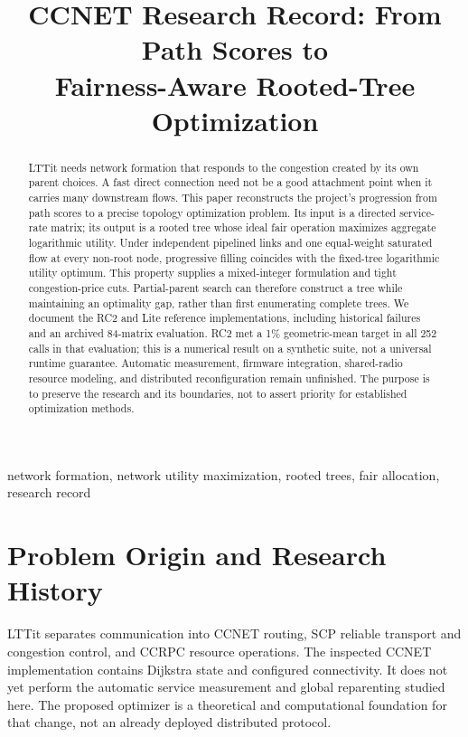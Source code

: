 \documentclass[conference,letterpaper]{IEEEtran}
\title{CCNET Research Record: From Path Scores to\\Fairness-Aware Rooted-Tree Optimization}
\author{\IEEEauthorblockN{Skai Uijing}\IEEEauthorblockA{LTTit Research\\Research record, October 6, 2026}}
\begin{document}
\maketitle
\begin{abstract}
LTTit needs network formation that responds to the congestion created by its own parent choices. A fast direct connection need not be a good attachment point when it carries many downstream flows. This paper reconstructs the project's progression from path scores to a precise topology optimization problem. Its input is a directed service-rate matrix; its output is a rooted tree whose ideal fair operation maximizes aggregate logarithmic utility. Under independent pipelined links and one equal-weight saturated flow at every non-root node, progressive filling coincides with the fixed-tree logarithmic utility optimum. This property supplies a mixed-integer formulation and tight congestion-price cuts. Partial-parent search can therefore construct a tree while maintaining an optimality gap, rather than first enumerating complete trees. We document the RC2 and Lite reference implementations, including historical failures and an archived 84-matrix evaluation. RC2 met a 1\% geometric-mean target in all 252 calls in that evaluation; this is a numerical result on a synthetic suite, not a universal runtime guarantee. Automatic measurement, firmware integration, shared-radio resource modeling, and distributed reconfiguration remain unfinished. The purpose is to preserve the research and its boundaries, not to assert priority for established optimization methods.
\end{abstract}
\begin{IEEEkeywords}
network formation, network utility maximization, rooted trees, fair allocation, research record
\end{IEEEkeywords}

\section{Problem Origin and Research History}
LTTit separates communication into CCNET routing, SCP reliable transport and congestion control, and CCRPC resource operations. The inspected CCNET implementation contains Dijkstra state and configured connectivity. It does not yet perform the automatic service measurement and global reparenting studied here. The proposed optimizer is a theoretical and computational foundation for that change, not an already deployed distributed protocol.
\end{document}
